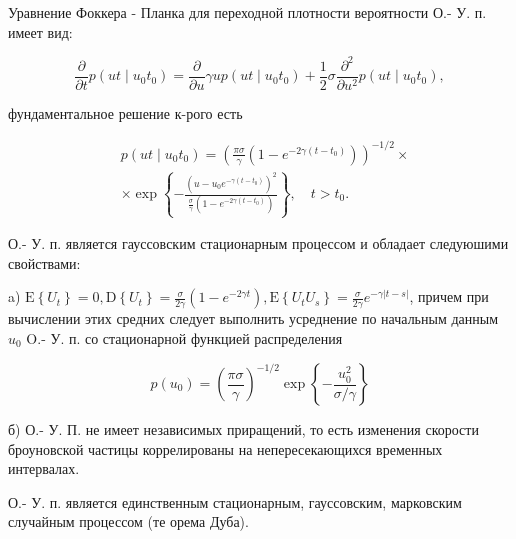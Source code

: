 \documentclass[10pt]{article}
\begin{document}
Уравнение Фоккера - Планка для переходной плотности вероятности О.- У. п. имеет вид:



\[

\frac{\partial}{\partial t} p\left(u t \mid u_{0} t_{0}\right)=\frac{\partial}{\partial u} \gamma u p\left(u t \mid u_{0} t_{0}\right)+\frac{1}{2} \sigma \frac{\partial^{2}}{\partial u^{2}} p\left(u t \mid u_{0} t_{0}\right),

\]



фундаментальное решение к-рого есть



\[

\begin{aligned}

& p\left(u t \mid u_{0} t_{0}\right)=\left(\frac{\pi \sigma}{\gamma}\left(1-e^{-2 \gamma\left(t-t_{0}\right)}\right)\right)^{-1 / 2} \times \\

& \times \exp \left\{-\frac{\left(u-u_{0} e^{-\gamma\left(t-t_{0}\right)}\right)^{2}}{\frac{\sigma}{\gamma}\left(1-e^{-2 \gamma\left(t-t_{0}\right)}\right)}\right\}, \quad t>t_{0} .

\end{aligned}

\]



О.- У. п. является гауссовским стационарным процессом и обладает следуюшими свойствами:



a) $\mathrm{E}\left\{U_{t}\right\}=0, \mathrm{D}\left\{U_{t}\right\}=\frac{\sigma}{2 \gamma}\left(1-e^{-2 \gamma t}\right), \mathrm{E}\left\{U_{t} U_{s}\right\}=\frac{\sigma}{2 \gamma} e^{-\gamma|t-s|}$, причем при вычислении этих средних следует выполнить усреднение по начальным данным $u_{0}$ O.- У. п. со стационарной функцией распределения



\[

p\left(u_{0}\right)=\left(\frac{\pi \sigma}{\gamma}\right)^{-1 / 2} \exp \left\{-\frac{u_{0}^{2}}{\sigma / \gamma}\right\}

\]



б) О.- У. П. не имеет независимых приращений, то есть изменения скорости броуновской частицы коррелированы на непересекающихся временных интервалах.



О.- У. п. является единственным стационарным, гауссовским, марковским случайным процессом (те орема Дуба).
\end{document}
